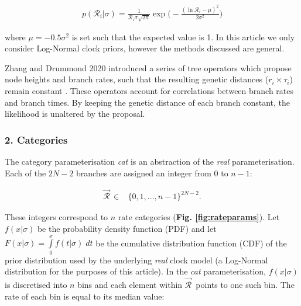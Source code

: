 \documentclass[10pt,letterpaper]{article}
\begin{document}
\begin{align}
p(\mathcal{R}_i | \sigma) = \frac{1}{\mathcal{R}_i \sigma \sqrt{2\pi}} \exp \big( -\frac{(\ln \mathcal{R}_i - \mu)^2}{2\sigma^2} \big) 
\end{align}


where $\mu = -0.5\sigma^2$ is set such that the expected value is 1.
In this article we only consider Log-Normal clock priors, however the methods discussed are general.


Zhang and Drummond 2020 introduced a series of tree operators which propose node heights and branch rates, such that the resulting genetic distances ($r_i \times \tau_i$) remain constant \cite{zhang2020improving}. 
These operators account for correlations between branch rates and branch times.
By keeping the genetic distance of each branch constant, the likelihood is unaltered by the proposal. 







\subsubsection*{2. Categories}
The category parameterisation \textit{cat} is an abstraction of the \textit{real} parameterisation. 
Each of the $2N-2$ branches are assigned an integer from $0$ to $n-1$:

\begin{align}
\vec{\mathcal{R}}^{\,} \in& \{ 0, 1, \dotso, n-1 \}^{2N-2}.
\end{align}


These integers correspond to $n$ rate categories (\textbf{Fig. \ref{fig:rateparams}}).
Let $f(x|\sigma)$ be the probability density function (PDF) and let $F(x|\sigma) = \int\limits_{0}^{x} f(t|\sigma) \; dt$ be the cumulative distribution function (CDF) of the prior distribution used by the underlying \textit{real} clock model (a Log-Normal distribution for the purposes of this article). 
In the \textit{cat} parameterisation, $f(x|\sigma)$ is discretised into $n$ bins and each element within $\vec{\mathcal{R}}^{\,}$ points to one such bin.
The rate of each bin is equal to its median value:
\end{document}
